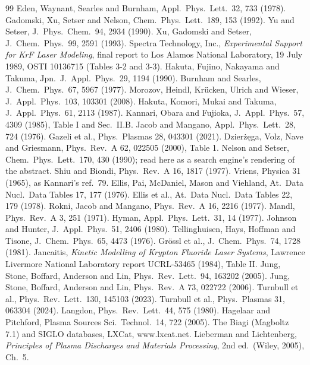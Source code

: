 \documentclass[11pt]{article}
\begin{document}
\begin{thebibliography}{99}
\footnotesize
\setlength{\itemsep}{1pt}
 Eden, Waynant, Searles and Burnham, Appl.\ Phys.\ Lett.\ 32, 733 (1978).
 Gadomski, Xu, Setser and Nelson, Chem.\ Phys.\ Lett.\ 189, 153 (1992).
 Yu and Setser, J.\ Phys.\ Chem.\ 94, 2934 (1990).
 Xu, Gadomski and Setser, J.\ Chem.\ Phys.\ 99, 2591 (1993).
 Spectra Technology, Inc., \emph{Experimental Support for KrF Laser Modeling}, final report to Los Alamos National Laboratory, 19 July 1989, OSTI 10136715 (Tables 3-2 and 3-3).
 Hakuta, Fujino, Nakayama and Takuma, Jpn.\ J.\ Appl.\ Phys.\ 29, 1194 (1990).
 Burnham and Searles, J.\ Chem.\ Phys.\ 67, 5967 (1977).
 Morozov, Heindl, Kr\"ucken, Ulrich and Wieser, J.\ Appl.\ Phys.\ 103, 103301 (2008).
 Hakuta, Komori, Mukai and Takuma, J.\ Appl.\ Phys.\ 61, 2113 (1987).
 Kannari, Obara and Fujioka, J.\ Appl.\ Phys.\ 57, 4309 (1985), Table I and Sec.\ II.B.
 Jacob and Mangano, Appl.\ Phys.\ Lett.\ 28, 724 (1976).
 Gazeli et al., Phys.\ Plasmas 28, 043301 (2021).
 Dzier\.z\k{e}ga, Volz, Nave and Griesmann, Phys.\ Rev.\ A 62, 022505 (2000), Table 1.
 Nelson and Setser, Chem.\ Phys.\ Lett.\ 170, 430 (1990); read here as a search engine's rendering of the abstract.
 Shiu and Biondi, Phys.\ Rev.\ A 16, 1817 (1977).
 Vriens, Physica 31 (1965), as Kannari's ref.\ 79.
 Ellis, Pai, McDaniel, Mason and Viehland, At.\ Data Nucl.\ Data Tables 17, 177 (1976).
 Ellis et al., At.\ Data Nucl.\ Data Tables 22, 179 (1978).
 Rokni, Jacob and Mangano, Phys.\ Rev.\ A 16, 2216 (1977).
 Mandl, Phys.\ Rev.\ A 3, 251 (1971).
 Hyman, Appl.\ Phys.\ Lett.\ 31, 14 (1977).
 Johnson and Hunter, J.\ Appl.\ Phys.\ 51, 2406 (1980).
 Tellinghuisen, Hays, Hoffman and Tisone, J.\ Chem.\ Phys.\ 65, 4473 (1976).
 Gr\"ossl et al., J.\ Chem.\ Phys.\ 74, 1728 (1981).
 Jancaitis, \emph{Kinetic Modelling of Krypton Fluoride Laser Systems}, Lawrence Livermore National Laboratory report UCRL-53465 (1984), Table II.
 Jung, Stone, Boffard, Anderson and Lin, Phys.\ Rev.\ Lett.\ 94, 163202 (2005).
 Jung, Stone, Boffard, Anderson and Lin, Phys.\ Rev.\ A 73, 022722 (2006).
 Turnbull et al., Phys.\ Rev.\ Lett.\ 130, 145103 (2023).
 Turnbull et al., Phys.\ Plasmas 31, 063304 (2024).
 Langdon, Phys.\ Rev.\ Lett.\ 44, 575 (1980).
 Hagelaar and Pitchford, Plasma Sources Sci.\ Technol.\ 14, 722 (2005).
 The Biagi (Magboltz 7.1) and SIGLO databases, LXCat, www.lxcat.net.
 Lieberman and Lichtenberg, \emph{Principles of Plasma Discharges and Materials Processing}, 2nd ed.\ (Wiley, 2005), Ch.\ 5.
\end{thebibliography}
\end{document}
